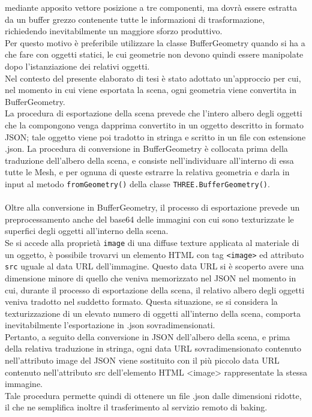 mediante apposito vettore posizione a tre componenti, ma dovrà essere estratta da un buffer grezzo contenente tutte le informazioni di trasformazione, richiedendo inevitabilmente un maggiore sforzo produttivo.
\\
Per questo motivo è preferibile utilizzare la classe BufferGeometry quando si ha a che fare con oggetti statici, le cui geometrie non devono quindi essere manipolate dopo l’istanziazione dei relativi oggetti.
\\
Nel contesto del presente elaborato di tesi è stato adottato un’approccio per cui, nel momento in cui viene esportata la scena, ogni geometria viene convertita in BufferGeometry.    
\\
La procedura di esportazione della scena prevede che l’intero albero degli oggetti che la compongono venga dapprima convertito in un oggetto descritto in formato JSON; tale oggetto viene poi tradotto in stringa e scritto in un file con estensione .json. La procedura di conversione in BufferGeometry è collocata prima della traduzione dell’albero della scena, e consiste nell’individuare all’interno di essa tutte le Mesh, e per ognuna di queste estrarre la relativa geometria e darla in input al metodo \texttt{fromGeometry()} della classe \texttt{THREE.BufferGeometry()}. 
\\
\\
Oltre alla conversione in BufferGeometry, il processo di esportazione prevede un preprocessamento anche del base64 delle immagini con cui sono texturizzate le superfici degli oggetti all’interno della scena. 
\\
Se si accede alla proprietà \texttt{image} di una diffuse texture applicata al materiale di un oggetto, è possibile trovarvi un elemento HTML con tag \texttt{<image>} ed attributo \texttt{src} uguale al data URL dell’immagine. Questo data URL si è scoperto avere una dimensione minore di quello che veniva memorizzato nel JSON nel momento in cui, durante il processo di esportazione della scena, il relativo albero degli oggetti veniva tradotto nel suddetto formato. Questa situazione, se si considera la texturizzazione di un elevato numero di oggetti all’interno della scena, comporta inevitabilmente l’esportazione in .json sovradimensionati. 
\\
Pertanto, a seguito della conversione in JSON dell’albero della scena, e prima della relativa traduzione in stringa, ogni data URL sovradimensionato contenuto nell’attributo image del JSON viene sostituito con il più piccolo data URL contenuto nell’attributo src dell’elemento HTML <image> rappresentate la stessa immagine.
\\
Tale procedura permette quindi di ottenere un file .json dalle dimensioni ridotte, il che ne semplifica inoltre il trasferimento al servizio remoto di baking. 

